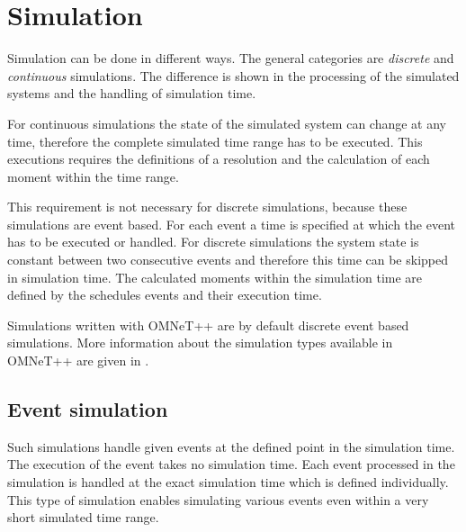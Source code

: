 \chapter{Simulation}
\label{cha:simulation}




Simulation can be done in different ways. The general categories are \emph{discrete} and \emph{continuous} simulations.
The difference is shown in the processing of the simulated systems and the handling of simulation time.

For continuous simulations the state of the simulated system can change at any time, therefore the complete simulated time range has to be executed.
This executions requires the definitions of a resolution and the calculation of each moment within the time range.

This requirement is not necessary for discrete simulations, because these simulations are event based.
For each event a time is specified at which the event has to be executed or handled.
For discrete simulations the system state is constant between two consecutive events and therefore this time can be skipped in simulation time.
The calculated moments within the simulation time are defined by the schedules events and their execution time.

Simulations written with OMNeT++ are by default discrete event based simulations.
More information about the simulation types available in OMNeT++ are given in \cite[section 4.1]{omnet_manual}.

\section{Event simulation}
\label{sec:simulation_event}
Such simulations handle given events at the defined point in the simulation time.
The execution of the event takes no simulation time.
Each event processed in the simulation is handled at the exact simulation time which is defined individually.
This type of simulation enables simulating various events even within a very short simulated time range.


